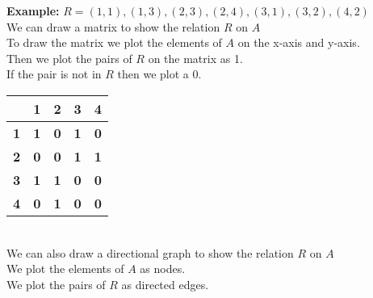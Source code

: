 \textbf{Example:}
$R ={(1,1),(1,3),(2,3),(2,4),(3,1),(3,2),(4,2)}$ \\
We can draw a matrix to show the relation $R$ on $A$ \\
To draw the matrix we plot the elements of $A$ on the x-axis and y-axis. \\
Then we plot the pairs of $R$ on the matrix as 1. \\
If the pair is not in $R$ then we plot a 0. \\
\begin{tabular}{|c|c|c|c|c|}
\hline
\multicolumn{1}{|c|}{\textbf{}} & \multicolumn{1}{c|}{\textbf{1}} & \multicolumn{1}{c|}{\textbf{2}} & \multicolumn{1}{c|}{\textbf{3}} & \multicolumn{1}{c|}{\textbf{4}} \\ \hline
\multicolumn{1}{|c|}{\textbf{1}} & \multicolumn{1}{c|}{\textbf{1}} & \multicolumn{1}{c|}{\textbf{0}} & \multicolumn{1}{c|}{\textbf{1}} & \multicolumn{1}{c|}{\textbf{0}} \\ \hline
\multicolumn{1}{|c|}{\textbf{2}} & \multicolumn{1}{c|}{\textbf{0}} & \multicolumn{1}{c|}{\textbf{0}} & \multicolumn{1}{c|}{\textbf{1}} & \multicolumn{1}{c|}{\textbf{1}} \\ \hline
\multicolumn{1}{|c|}{\textbf{3}} & \multicolumn{1}{c|}{\textbf{1}} & \multicolumn{1}{c|}{\textbf{1}} & \multicolumn{1}{c|}{\textbf{0}} & \multicolumn{1}{c|}{\textbf{0}} \\ \hline
\multicolumn{1}{|c|}{\textbf{4}} & \multicolumn{1}{c|}{\textbf{0}} & \multicolumn{1}{c|}{\textbf{1}} & \multicolumn{1}{c|}{\textbf{0}} & \multicolumn{1}{c|}{\textbf{0}} \\ \hline
\end{tabular} \\
We can also draw a directional graph to show the relation $R$ on $A$ \\
We plot the elements of $A$ as nodes. \\
We plot the pairs of $R$ as directed edges. \\
 \\

